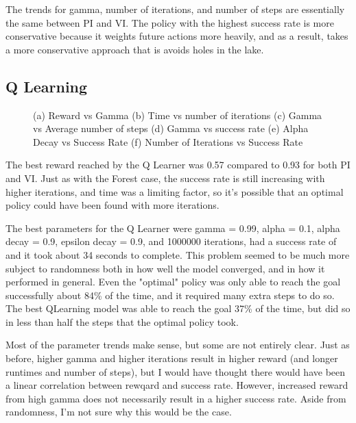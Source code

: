 \documentclass[
	letterpaper, %
]{mlreport}
\begin{document}
The trends for gamma, number of iterations, and number of steps are essentially the same between PI and VI. The policy with the highest success rate is more conservative because it weights future actions more heavily, and as a result, takes a more conservative approach that is avoids holes in the lake.


\subsection{Q Learning}
\begin{figure}
	\centering
	\caption{(a) Reward vs Gamma (b) Time vs number of iterations (c) Gamma vs Average number of steps (d) Gamma vs success rate (e) Alpha Decay vs Success Rate (f) Number of Iterations vs Success Rate}
	\label{fig:fig8}
\end{figure}
The best reward reached by the Q Learner was 0.57 compared to 0.93 for both PI and VI. Just as with the Forest case, the success rate is still increasing with higher iterations, and time was a limiting factor, so it's possible that an optimal policy could have been found with more iterations.

The best parameters for the Q Learner were gamma = 0.99, alpha = 0.1, alpha decay = 0.9, epsilon decay = 0.9, and 1000000 iterations, had a success rate of  and it took about 34 seconds to complete. This problem seemed to be much more subject to randomness both in how well the model converged, and in how it performed in general. Even the "optimal" policy was only able to reach the goal successfully about 84\% of the time, and it required many extra steps to do so. The best QLearning model was able to reach the goal 37\% of the time, but did so in less than half the steps that the optimal policy took.

Most of the parameter trends make sense, but some are not entirely clear. Just as before, higher gamma and higher iterations result in higher reward (and longer runtimes and number of steps), but I would have thought there would have been a linear correlation between rewqard and success rate. However, increased reward from high gamma does not necessarily result in a higher success rate. Aside from randomness, I'm not sure why this would be the case.
\end{document}
